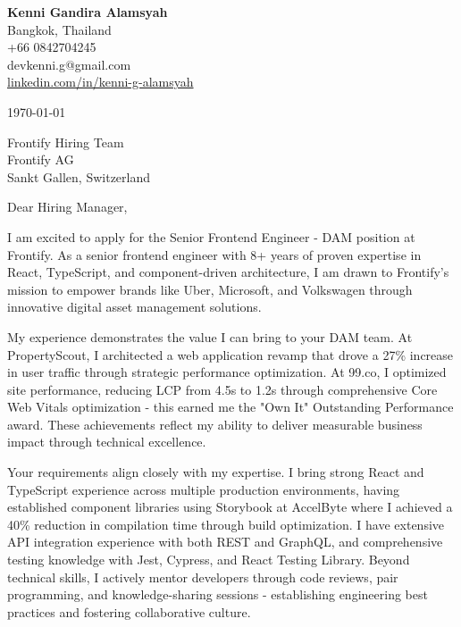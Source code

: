 \documentclass[a4paper, 11pt]{article}
\begin{document}
\begin{flushleft}
    \textbf{\Large Kenni Gandira Alamsyah} \\
    Bangkok, Thailand \\
    +66 0842704245 \\
    devkenni.g@gmail.com \\
    \href{https://www.linkedin.com/in/kenni-g-alamsyah/}{linkedin.com/in/kenni-g-alamsyah}
\end{flushleft}

\vspace{10pt}

\begin{flushleft}
    \today
\end{flushleft}

\vspace{10pt}

\begin{flushleft}
    Frontify Hiring Team \\
    Frontify AG \\
    Sankt Gallen, Switzerland
\end{flushleft}

\vspace{10pt}

Dear Hiring Manager,

I am excited to apply for the Senior Frontend Engineer - DAM position at Frontify. As a senior frontend engineer with 8+ years of proven expertise in React, TypeScript, and component-driven architecture, I am drawn to Frontify's mission to empower brands like Uber, Microsoft, and Volkswagen through innovative digital asset management solutions.

My experience demonstrates the value I can bring to your DAM team. At PropertyScout, I architected a web application revamp that drove a 27\% increase in user traffic through strategic performance optimization. At 99.co, I optimized site performance, reducing LCP from 4.5s to 1.2s through comprehensive Core Web Vitals optimization - this earned me the "Own It" Outstanding Performance award. These achievements reflect my ability to deliver measurable business impact through technical excellence.

Your requirements align closely with my expertise. I bring strong React and TypeScript experience across multiple production environments, having established component libraries using Storybook at AccelByte where I achieved a 40\% reduction in compilation time through build optimization. I have extensive API integration experience with both REST and GraphQL, and comprehensive testing knowledge with Jest, Cypress, and React Testing Library. Beyond technical skills, I actively mentor developers through code reviews, pair programming, and knowledge-sharing sessions - establishing engineering best practices and fostering collaborative culture.
\end{document}
